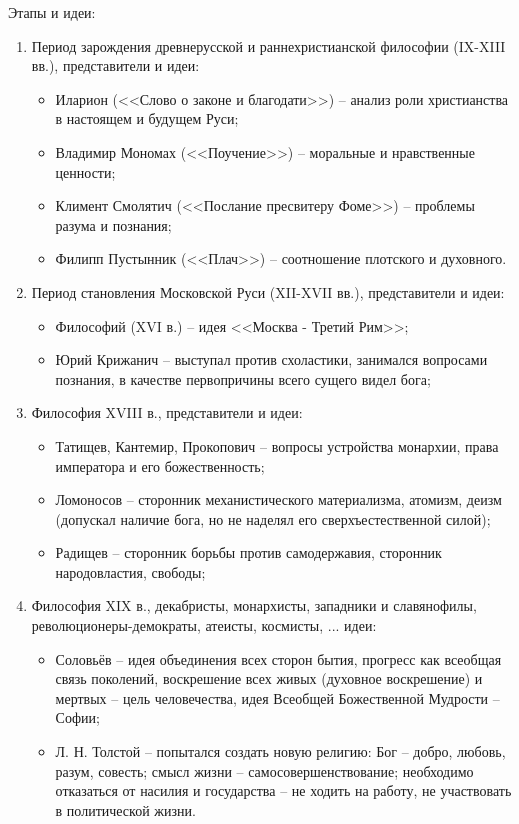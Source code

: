Этапы и идеи:
\begin{enumerate}
	\item Период зарождения древнерусской и раннехристианской философии (IX-XIII вв.), представители и идеи:
	\begin{itemize}
		\item Иларион (<<Слово о законе и благодати>>) -- анализ роли христианства в настоящем и будущем Руси;
		\item Владимир Мономах (<<Поучение>>) -- моральные и нравственные ценности;
		\item Климент Смолятич (<<Послание пресвитеру Фоме>>) -- проблемы разума и познания;
		\item Филипп Пустынник (<<Плач>>) -- соотношение плотского и духовного.
	\end{itemize}
	\item Период становления Московской Руси (XII-XVII вв.), представители и идеи:
	\begin{itemize}
		\item Философий (XVI в.) -- идея <<Москва - Третий Рим>>;
		\item Юрий Крижанич -- выступал против схоластики, занимался вопросами познания, в качестве первопричины всего сущего видел бога;
	\end{itemize}
	\item Философия XVIII в., представители и идеи:
	\begin{itemize}
		\item Татищев, Кантемир, Прокопович -- вопросы устройства монархии, права императора и его божественность;
		\item Ломоносов -- сторонник механистического материализма, атомизм, деизм (допускал наличие бога, но не наделял его сверхъестественной силой);
		\item Радищев -- сторонник борьбы против самодержавия, сторонник народовластия, свободы;
	\end{itemize}
	\item Философия XIX в., декабристы, монархисты, западники и славянофилы, революционеры-демократы, атеисты, космисты, ... идеи:
	\begin{itemize}
		\item Соловьёв -- идея объединения всех сторон бытия, прогресс как всеобщая связь поколений, воскрешение всех живых (духовное воскрешение) и мертвых -- цель человечества, идея Всеобщей Божественной Мудрости -- Софии;
		\item Л. Н. Толстой -- попытался создать новую религию: Бог -- добро, любовь, разум, совесть; смысл жизни -- самосовершенствование; необходимо отказаться от насилия и государства -- не ходить на работу, не участвовать в политической жизни.

\end{itemize}
\end{enumerate}
